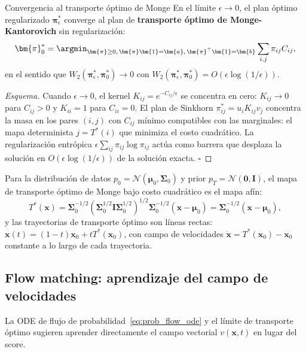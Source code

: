 \begin{teorema}{Convergencia al transporte óptimo de Monge}
\label{thm:ot_limite}
En el límite $\epsilon \to 0$, el plan óptimo regularizado $\bm{\pi}^*_\epsilon$
converge al plan de \textbf{transporte óptimo de Monge-Kantorovich} sin
regularización:
\begin{equation}
  \bm{\pi}^*_0 = \argmin_{\bm{\pi}\geq 0,\,\bm{\pi}\bm{1}=\bm{a},\,
  \bm{\pi}^\top\bm{1}=\bm{b}}
  \sum_{i,j}\pi_{ij}C_{ij},
  \label{eq:ot_sin_reg}
\end{equation}
en el sentido que $W_2(\bm{\pi}^*_\epsilon,\bm{\pi}^*_0)\to 0$ con
$W_2(\bm{\pi}^*_\epsilon,\bm{\pi}^*_0) = O(\epsilon\log(1/\epsilon))$.
\end{teorema}

\begin{proof}[Esquema]
Cuando $\epsilon \to 0$, el kernel $K_{ij} = e^{-C_{ij}/\epsilon}$ se concentra
en cero: $K_{ij} \to 0$ para $C_{ij} > 0$ y $K_{ii} = 1$ para $C_{ii} = 0$.
El plan de Sinkhorn $\pi_{ij}^* = u_i K_{ij} v_j$ concentra la masa en los
pares $(i,j)$ con $C_{ij}$ mínimo compatibles con las marginales: el mapa
determinista $j = T^*(i)$ que minimiza el costo cuadrático. La regularización
entrópica $\epsilon\sum_{ij}\pi_{ij}\log\pi_{ij}$ actúa como barrera que
desplaza la solución en $O(\epsilon\log(1/\epsilon))$ de la solución exacta.
$\square$
\end{proof}

Para la distribución de datos $p_0 = \mathcal{N}(\bm{\mu}_0, \bm{\Sigma}_0)$
y prior $p_T = \mathcal{N}(\bm{0},\bm{I})$, el mapa de transporte óptimo de
Monge bajo costo cuadrático es el mapa afín:
\begin{equation}
  T^*(\bm{x}) = \bm{\Sigma}_0^{-1/2}
  \left(\bm{\Sigma}_0^{1/2}\bm{I}\bm{\Sigma}_0^{1/2}\right)^{1/2}
  \bm{\Sigma}_0^{-1/2}(\bm{x}-\bm{\mu}_0)
  = \bm{\Sigma}_0^{-1/2}(\bm{x}-\bm{\mu}_0),
  \label{eq:monge_gaussiana}
\end{equation}
y las trayectorias de transporte óptimo son líneas rectas:
$\bm{x}(t) = (1-t)\bm{x}_0 + t T^*(\bm{x}_0)$,
con campo de velocidades $\dot{\bm{x}} = T^*(\bm{x}_0)-\bm{x}_0$ constante a
lo largo de cada trayectoria.

\subsection{Flow matching: aprendizaje del campo de velocidades}
\label{subsec:flow_matching}

La ODE de flujo de probabilidad~\eqref{eq:prob_flow_ode} y el límite de
transporte óptimo sugieren aprender directamente el campo vectorial $v(\bm{x},t)$
en lugar del score.

